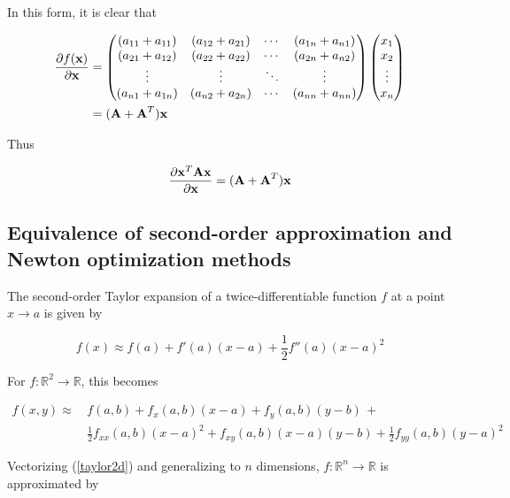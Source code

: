 \documentclass{article}
\newcommand{\R}{\mathbb{R}}
\newcommand{\vect}[1]{\textbf{\textrm{#1}}}
\newcommand{\pd}[2]{\frac{\partial {#1}}{\partial {#2}}}
\begin{document}
In this form, it is clear that

\begin{align*}
	\pd{f(\vect{x})}{\vect{x}} & = 
	\begin{pmatrix}
		(a_{11} + a_{11}) & (a_{12} + a_{21}) & \cdots & (a_{1n} + a_{n1}) \\
		(a_{21} + a_{12}) & (a_{22} + a_{22}) & \cdots & (a_{2n} + a_{n2}) \\
		\vdots & \vdots & \ddots & \vdots \\
		(a_{n1} + a_{1n}) & (a_{n2} + a_{2n}) & \cdots & (a_{nn} + a_{nn}) 
	\end{pmatrix} 
	\begin{pmatrix}
		x_1 \\ 
		x_2 \\ 
		\vdots \\ 
		x_n
	\end{pmatrix} \\
	& = (\vect{A} + \vect{A}^{T})\vect{x}
\end{align*}

Thus

\begin{equation} \label{scalargradqf}
	\pd{\vect{x}^{T}\vect{Ax}}{\vect{x}} = (\vect{A} + \vect{A}^{T})\vect{x}
\end{equation}

\subsection{Equivalence of second-order approximation and Newton optimization methods}
The second-order Taylor expansion of a twice-differentiable function $f$ at a point $x \rightarrow a$ is given by

\begin{equation} \label{taylor1d}
	f(x) \approx f(a) + f'(a)(x - a) + \frac{1}{2}f''(a)(x - a)^2
\end{equation}

For $f: \R^2 \rightarrow \R$, this becomes

\begin{align} \label{taylor2d}
	f(x,y) \approx \, & f(a,b) + f_x(a,b)(x - a) + f_y(a,b)(y - b) \, + \nonumber \\
					   & \frac{1}{2}f_{xx}(a,b)(x - a)^2 + f_{xy}(a,b)(x - a)(y - b) + 
						 \frac{1}{2}f_{yy}(a,b)(y - a)^2 
\end{align}
 
Vectorizing (\ref{taylor2d}) and generalizing to $n$ dimensions, $f: \R^n \rightarrow \R$ is approximated by
\end{document}
